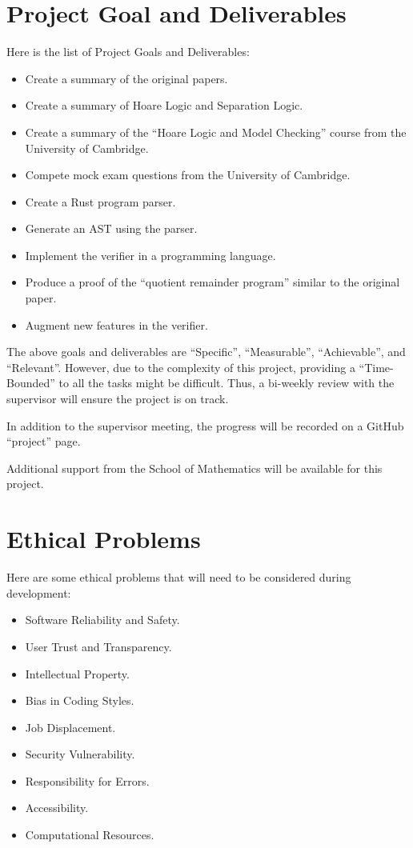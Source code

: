\documentclass[11pt,a4paper]{article}
\begin{document}
\section{Project Goal and Deliverables}
Here is the list of Project Goals and Deliverables:
\begin{itemize}
      \item Create a summary of the original papers.
      \item Create a summary of Hoare Logic and Separation Logic.
      \item Create a summary of the ``Hoare Logic and Model Checking'' course from the University of Cambridge.
      \item Compete mock exam questions from the University of Cambridge.
      \item Create a Rust program parser.
      \item Generate an AST using the parser.
      \item Implement the verifier in a programming language.
      \item Produce a proof of the ``quotient remainder program'' similar to the original paper.
      \item Augment new features in the verifier.
\end{itemize}
\vspace{60pt}
The above goals and deliverables are ``Specific'', ``Measurable'', ``Achievable'', and ``Relevant''. However, due to the complexity of this project, providing a ``Time-Bounded'' to all the tasks might be difficult. Thus, a bi-weekly review with the supervisor will ensure the project is on track. 

\vspace{14pt}

In addition to the supervisor meeting, the progress will be recorded on a GitHub ``project'' page. 

\vspace{14pt}

Additional support from the School of Mathematics will be available for this project.  

\pagebreak
\section{Ethical Problems}
Here are some ethical problems that will need to be considered during development:
\begin{itemize}
      \item Software Reliability and Safety.
      \item User Trust and Transparency.
      \item Intellectual Property.
      \item Bias in Coding Styles.
      \item Job Displacement.
      \item Security Vulnerability.
      \item Responsibility for Errors.
      \item Accessibility.
      \item Computational Resources.
\end{itemize}
\end{document}
